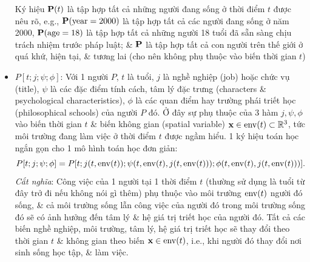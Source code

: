 \documentclass[12pt,oneside]{book}
\begin{document}
\begin{itemize}
	Ký hiệu ${\bf P}(t)$ là tập hợp tất cả những người đang sống ở thời điểm $t$ được nêu rõ, e.g., ${\bf P}({\rm year} = 2000)$ là tập hợp tất cả các người đang sống ở năm 2000, ${\bf P}({\rm age} = 18)$ là tập hợp tất cả những người 18 tuổi đã sẵn sàng chịu trách nhiệm trước pháp luật; \& ${\bf P}$ là tập hợp tất cả con người trên thế giới ở quá khứ, hiện tại, \& tương lai (cho nên không phụ thuộc vào biến thời gian $t$)
	\item $P[t;j;\psi;\phi]$: Với 1 người $P$, $t$ là tuổi, $j$ là nghề nghiệp (job) hoặc chức vụ (title), $\psi$ là các đặc điểm tính cách, tâm lý đặc trưng (characters \& psychological characteristics), $\phi$ là các quan điểm hay trường phái triết học (philosophical schools) của người $P$ đó. Ở đây sự phụ thuộc của 3 hàm $j,\psi,\phi$ vào biến thời gian $t$ \& biến không gian (spatial variable) ${\bf x}\in{\rm env}(t)\subset\mathbb{R}^3$, tức môi trường đang làm việc ở thời điểm $t$ được ngầm hiểu. 1 ký hiệu toán học ngắn gọn cho 1 mô hình toán học đơn giản:
	\begin{equation}
		P[t;j;\psi;\phi] = P[t;j(t,{\rm env}(t));\psi(t,{\rm env}(t),j(t,{\rm env}(t)));\phi(t,{\rm env}(t),j(t,{\rm env}(t)))].
	\end{equation}
	{\it Cắt nghĩa}: Công việc của 1 người tại 1 thời điểm $t$ (thường sử dụng là tuổi từ đây trở đi nếu không nói gì thêm) phụ thuộc vào môi trường ${\rm env}(t)$ người đó sống, \& cả môi trường sống lẫn công việc của người đó trong môi trường sống đó sẽ có ảnh hưởng đến tâm lý \& hệ giá trị triết học của người đó. Tất cả các biến nghề nghiệp, môi trường, tâm lý, hệ giá trị triết học sẽ thay đổi theo thời gian $t$ \& không gian theo biến ${\bf x}\in{\rm env}(t)$, i.e., khi người đó thay đổi nơi sinh sống học tập, \& làm việc.
	

\end{itemize}
\end{document}
